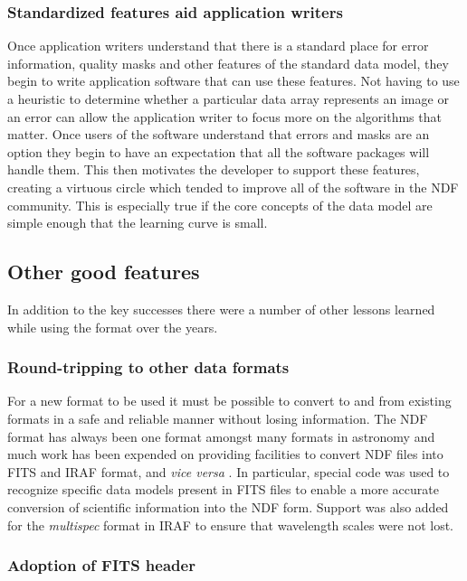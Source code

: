 \documentclass[final,authoryear,5p,times,twocolumn]{elsarticle}
\begin{document}
\subsubsection{Standardized features aid application writers}

Once application writers understand that there is a standard place for
error information, quality masks and other features of the standard
data model, they begin to write application software that can use
these features. Not having to use a heuristic to determine whether a
particular data array represents an image or an error can allow the
application writer to focus more on the algorithms that matter. Once
users of the software understand that errors and masks are an option
they begin to have an expectation that all the software packages will
handle them. This then motivates the developer to support these
features, creating a virtuous circle which tended to improve all of
the software in the NDF community.
This is especially true if the core concepts of the data
model are simple enough that the learning curve is small.

\subsection{Other good features}

In addition to the key successes there were a number of
other lessons learned while using the format over the years.

\subsubsection{Round-tripping to other data formats}
\label{sec:round_trip}

For a new format to be used it must be possible to convert to and from
existing formats in a safe and reliable manner without losing
information.  The NDF format has always been one format amongst many
formats in astronomy and much work has been expended on providing
facilities to convert NDF files into FITS and IRAF format, and
\textit{vice versa} \citep{SUN55,1997STARB..19...14C}.  In particular,
special code was used to recognize specific data models present in
FITS files to enable a more accurate conversion of scientific
information into the NDF form. Support was also added for the
\emph{multispec} format in IRAF \citep{1993ASPC...52..467V} to ensure
that wavelength scales were not lost.

\subsubsection{Adoption of FITS header}
\end{document}

